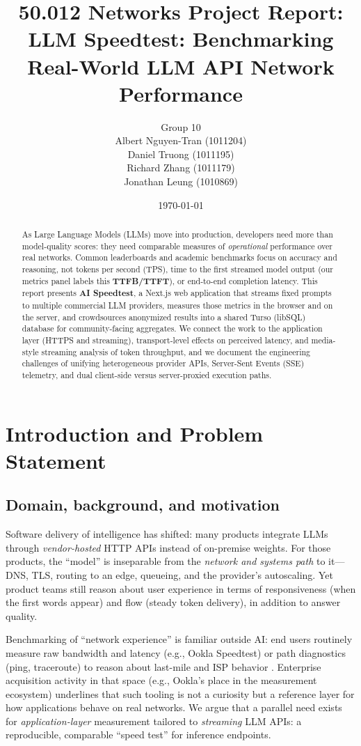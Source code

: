 \documentclass[11pt, a4paper]{article}
\title{50.012 Networks Project Report: \\ \textbf{LLM Speedtest: Benchmarking Real-World LLM API Network Performance}}
\author{Group 10\\ Albert Nguyen-Tran (1011204)\\ Daniel Truong (1011195)\\ Richard Zhang (1011179)\\ Jonathan Leung (1010869)}
\date{\today}
\begin{document}
\maketitle

\begin{abstract}
As Large Language Models (LLMs) move into production, developers need more than model-quality scores: they need comparable measures of \emph{operational} performance over real networks. Common leaderboards and academic benchmarks focus on accuracy and reasoning, not tokens per second (TPS), time to the first streamed model output (our metrics panel labels this \textbf{TTFB/TTFT}), or end-to-end completion latency. This report presents \textbf{AI Speedtest}, a Next.js web application that streams fixed prompts to multiple commercial LLM providers, measures those metrics in the browser and on the server, and crowdsources anonymized results into a shared Turso (libSQL) database for community-facing aggregates. We connect the work to the application layer (HTTPS and streaming), transport-level effects on perceived latency, and media-style streaming analysis of token throughput, and we document the engineering challenges of unifying heterogeneous provider APIs, Server-Sent Events (SSE) telemetry, and dual client-side versus server-proxied execution paths.
\end{abstract}

\section{Introduction and Problem Statement}

\subsection{Domain, background, and motivation}
Software delivery of intelligence has shifted: many products integrate LLMs through \emph{vendor-hosted} HTTP APIs instead of on-premise weights. For those products, the ``model'' is inseparable from the \emph{network and systems path} to it---DNS, TLS, routing to an edge, queueing, and the provider's autoscaling. Yet product teams still reason about user experience in terms of responsiveness (when the first words appear) and flow (steady token delivery), in addition to answer quality.

Benchmarking of ``network experience'' is familiar outside AI: end users routinely measure raw bandwidth and latency (e.g., Ookla Speedtest) or path diagnostics (ping, traceroute) to reason about last-mile and ISP behavior \cite{ookla}. Enterprise acquisition activity in that space (e.g., Ookla's place in the measurement ecosystem) underlines that such tooling is not a curiosity but a reference layer for how applications behave on real networks. We argue that a parallel need exists for \emph{application-layer} measurement tailored to \emph{streaming} LLM APIs: a reproducible, comparable ``speed test'' for inference endpoints.
\end{document}
